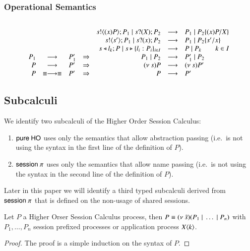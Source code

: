 \subsubsection{Operational Semantics}
\[
	\begin{array}{rcl}
	\end{array}
\]
\[
	\begin{array}{rclcrcl}
		&& && s ! \langle (x)P \rangle ; P_1 \;|\; s ? (X) ; P_2 &\longrightarrow& P_1 \;|\; P_2 \{(x)P/X \} \\
		&& && s ! \langle s' \rangle ; P_1 \;|\; s ? (x) ; P_2 &\longrightarrow& P_1 \;|\; P_2 \{s'/x \}\\
		&& && s \triangleleft l_k ; P \;|\; s \triangleright \{l_i : P_i\}_{i \in I} &\longrightarrow& P \;|\; P_k \qquad k \in I \\
		P_1 &\longrightarrow& P_1' &\Rightarrow& P_1 \;|\; P_2 &\longrightarrow& P_1' \;|\; P_2\\
		P &\longrightarrow& P' &\Rightarrow& (\nu\ s) P &\longrightarrow& (\nu\ s) P'\\
		P &\equiv \longrightarrow \equiv& P'&\Rightarrow& P &\longrightarrow& P' 		
	\end{array}
\]

\subsection{Subcalculi}

We identify two subcalculi of the Higher Order Session Calculus:
\begin{enumerate}
	\item	$\mathsf{pure\ HO}$ uses only the semantics that allow abstraction passing
		(i.e.\ is not using the syntax in the first line of the definition of $P$).
	\item	$\mathsf{session\ }\pi$ uses only the semantics that allow name passing
		(i.e.\ is not using the syntax in the second line of the definition of $P$).
\end{enumerate}

Later in this paper we will identify a third typed subcalculi derived
from $\mathsf{session\ }\pi$ that is defined on the non-usage of shared sessions.

\begin{proposition}[Normalisation]
	\label{prop:normal_form}
	Let $P$ a Higher Orser Session Calculus process, then
	$P \equiv (\nu\ \tilde{s})(P_1 \;|\; \dots \;|\; P_n)$ with
	$P_1, \dots, P_n$ session prefixed processes
	or application process $X\langle k \rangle$.
\end{proposition}

\begin{proof}
	The proof is a simple induction on the syntax of $P$.
\end{proof}
